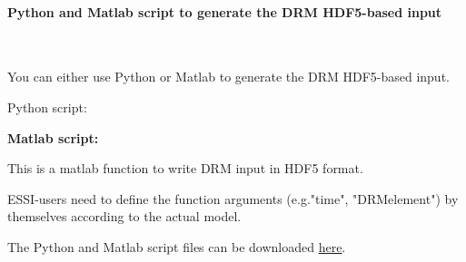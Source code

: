 \documentclass[fleqn,11pt]{article}
\begin{document}
\paragraph{Python and Matlab script to generate the DRM HDF5-based input} ~

You can either use Python or Matlab to generate the DRM HDF5-based input.  

Python script:



\newpage
\textbf{Matlab script:}

This is a matlab function to write DRM input in HDF5 format. 

ESSI-users need to define the function arguments (e.g."time", "DRMelement") by themselves according to the actual model. 



The Python and Matlab script files can be downloaded \href{https://github.com/BorisJeremic/Real-ESSI-Examples/blob/master/model_fei_file/Script_to_Generate_DRM_input/Script_to_Generate_DRM_input.tgz?raw=true}{here}.





\end{document}
